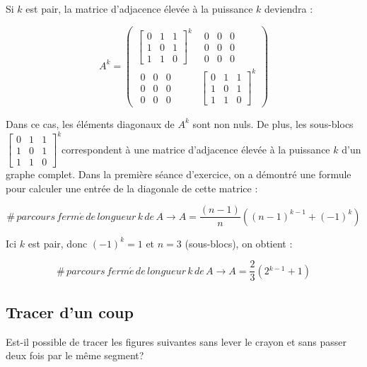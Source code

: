 \begin{solution}
Si $k$ est pair, la matrice d'adjacence élevée à la puissance $k$
deviendra :

\[
A^{k}=\left(\begin{array}{cc}
\left[\begin{array}{ccc}
0 & 1 & 1\\
1 & 0 & 1\\
1 & 1 & 0
\end{array}\right]^{k} & \begin{array}{ccc}
0 & 0 & 0\\
0 & 0 & 0\\
0 & 0 & 0
\end{array}\\
\begin{array}{ccc}
0 & 0 & 0\\
0 & 0 & 0\\
0 & 0 & 0
\end{array} & \left[\begin{array}{ccc}
0 & 1 & 1\\
1 & 0 & 1\\
1 & 1 & 0
\end{array}\right]^{k}
\end{array}\right)
\]


Dans ce cas, les éléments diagonaux de $A^{k}$ sont non nuls. De
plus, les sous-blocs $\left[\begin{array}{ccc}
0 & 1 & 1\\
1 & 0 & 1\\
1 & 1 & 0
\end{array}\right]^{k}$correspondent à une matrice d'adjacence élevée à la puissance $k$
d'un graphe complet. Dans la première séance d'exercice, on a démontré
une formule pour calculer une entrée de la diagonale de cette matrice
:

\[
\#\, parcours\, ferm\acute{e}\, de\, longueur\, k\, de\, A\rightarrow A=\frac{(n-1)}{n}((n-1)^{k-1}+(-1)^{k})
\]


Ici $k$ est pair, donc $(-1)^{k}=1$ et $n=3$ (sous-blocs), on obtient
:

\[
\#\, parcours\, ferm\acute{e}\, de\, longueur\, k\, de\, A\rightarrow A=\frac{2}{3}(2{}^{k-1}+1)
\]
\end{solution}

\subsection{Tracer d'un coup} Est-il possible de tracer les figures suivantes sans lever le crayon et sans passer deux fois par le même segment?


